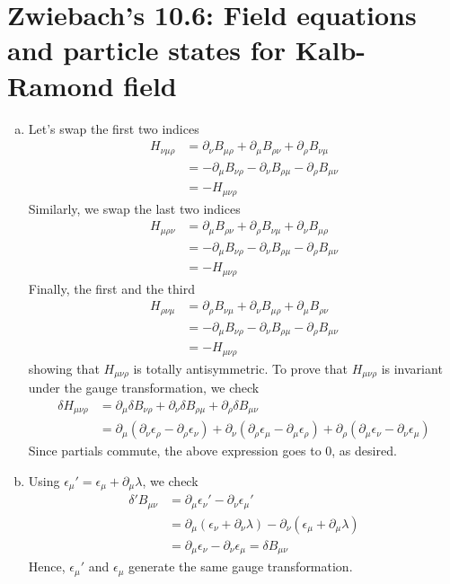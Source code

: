 \documentclass[11pt]{article}
\begin{document}
\newpage 
\section{Zwiebach's 10.6: Field equations and particle states for Kalb-Ramond field}
\begin{enumerate} [(a)]
    \item Let's swap the first two indices 
    \begin{align*}
        H_{\nu \mu \rho} &= \partial_\nu B_{\mu\rho} + \partial_\mu B_{\rho\nu} + \partial_\rho B_{\nu \mu} \\
        &= -\partial_\mu B_{\nu\rho} -\partial_\nu B_{\rho\mu} - \partial_\rho B_{\mu\nu } \\
        &= - H_{\mu\nu\rho}
    \end{align*}
    Similarly, we swap the last two indices 
    \begin{align*}
        H_{\mu \rho \nu} &= \partial_\mu B_{\rho\nu} + \partial_\rho B_{\nu\mu} + \partial_\nu B_{\mu \rho} \\
        &= -\partial_\mu B_{\nu\rho} -\partial_\nu B_{\rho\mu} - \partial_\rho B_{\mu\nu } \\
        &= - H_{\mu\nu\rho}
    \end{align*}
    Finally, the first and the third
    \begin{align*}
        H_{\rho \nu \mu} &= \partial_\rho B_{\nu\mu} + \partial_\nu B_{\mu\rho} + \partial_\mu B_{\rho \nu} \\
        &= -\partial_\mu B_{\nu\rho} -\partial_\nu B_{\rho\mu} - \partial_\rho B_{\mu\nu } \\
        &= - H_{\mu\nu\rho}
    \end{align*}
    showing that $H_{\mu\nu\rho}$ is totally antisymmetric. To prove that $H_{\mu\nu\rho}$ is invariant under the gauge transformation, we check 
    \begin{align*}
        \delta H_{\mu\nu\rho} &= \partial_\mu \delta B_{\nu\rho} +\partial_\nu \delta B_{\rho\mu} +\partial_\rho \delta B_{\mu\nu } \\
        &= \partial_\mu (\partial_\nu \epsilon_\rho - \partial_\rho \epsilon_\nu) + \partial_\nu (\partial_\rho \epsilon_\mu - \partial_\mu \epsilon_\rho) + \partial_\rho  (\partial_\mu \epsilon_\nu - \partial_\nu \epsilon_\mu)
    \end{align*}
    Since partials commute, the above expression goes to 0, as desired. 

    \item Using $\epsilon_\mu' = \epsilon_\mu + \partial_\mu \lambda$, we check 
    \begin{align*}
        \delta' B_{\mu\nu} &= \partial_\mu \epsilon_\nu' - \partial_\nu \epsilon_\mu'\\
        &= \partial_\mu (\epsilon_\nu + \partial_\nu \lambda) - \partial_\nu (\epsilon_\mu + \partial_\mu \lambda) \\
        &= \partial_\mu \epsilon_\nu - \partial_\nu \epsilon_\mu = \delta B_{\mu\nu}
    \end{align*}
    Hence, $\epsilon_\mu'$ and $\epsilon_\mu$ generate the same gauge transformation. 


\end{enumerate}
\end{document}
